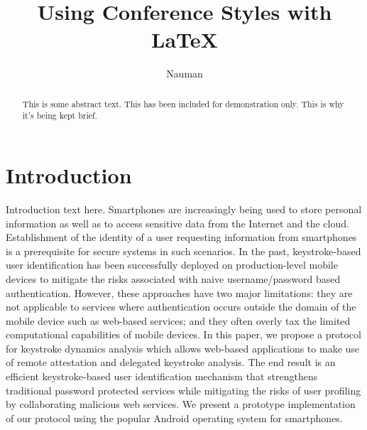 \documentclass{article}
\begin{document}
\title{Using Conference Styles with \LaTeX}
\author{Nauman}
\maketitle

\begin{abstract} 
This is some abstract text. This has been included for demonstration only. This is why it's being kept brief. 
\end{abstract} 


\section{Introduction}
Introduction text here. Smartphones are increasingly being used to store personal information as well as to access sensitive data from the Internet and the cloud. Establishment of the identity of a user requesting information from smartphones is a prerequisite for  secure systems in such scenarios. In the past, keystroke-based user identification has been successfully deployed on production-level mobile devices to mitigate the risks associated with naive username/password based authentication. However, these approaches have two major limitations: they are not applicable to services where authentication occurs outside the domain of the mobile
device such as web-based services; and they often overly tax the limited computational capabilities of mobile devices. In this paper, we propose a protocol for keystroke dynamics analysis which allows web-based applications to make use of remote attestation and delegated keystroke analysis. The end result is an efficient keystroke-based user identification mechanism that strengthens traditional password protected services
while mitigating the risks of user profiling by collaborating malicious web
services. We present a prototype implementation of our protocol using
the popular Android operating system for smartphones.
\end{document}
